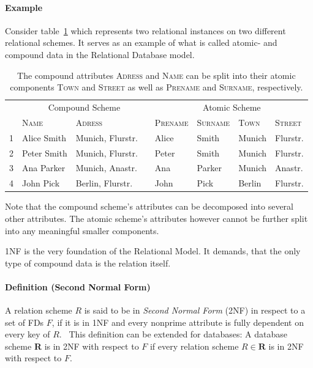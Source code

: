 \paragraph{Example}Consider table~\ref{tab:first-normal-form} which represents two relational instances on two different relational schemes.
It serves as an example of what is called atomic- and compound data in the Relational Database model.~\cite[p.~6]{COD90}

\begin{table}[ht]
    \centering
    \begin{tabular}{rlllllll}
        \toprule
        \toprule
    & \multicolumn{3}{c}{Compound Scheme} & & \multicolumn{2}{c}{Atomic Scheme} \\
    \cmidrule{2-3} \cmidrule{5-8}
    & \textsc{Name} & \textsc{Adress} && \textsc{Prename} & \textsc{Surname} & \textsc{Town} & \textsc{Street}   \\ \midrule
1 & Alice Smith & Munich, Flurstr. && Alice & Smith & Munich & Flurstr. \\
2 & Peter Smith & Munich, Flurstr. && Peter & Smith & Munich & Flurstr. \\
3 & Ana Parker & Munich, Anastr. && Ana & Parker & Munich & Anastr. \\
4 & John Pick & Berlin, Flurstr. && John & Pick & Berlin & Flurstr. \\
\bottomrule
\bottomrule
\end{tabular}
\caption{The compound attributes \textsc{Adress} and \textsc{Name} can be split into their atomic components \textsc{Town} and \textsc{Street} as well as \textsc{Prename} and \textsc{Surname}, respectively.}\label{tab:first-normal-form}
\end{table}
Note that the compound scheme's attributes can be decomposed into several other attributes.
The atomic scheme's attributes however cannot be further split into any meaningful smaller components.

1NF is the very foundation of the Relational Model. It demands, that the only type of compound data is the relation itself.~\cite[p.~6]{COD90}

\paragraph{Definition (Second Normal Form)} A relation scheme \(R\) is said to be in \emph{Second Normal Form} (2NF) in respect to a set of FDs \(F\), if it is in 1NF and every nonprime attribute is fully dependent on every key of \(R\).~\cite[p.~99]{MAI83}
This definition can be extended for databases: A database scheme \textbf{R} is in 2NF with respect to \(F\) if every relation scheme \(R \in \textbf{R} \) is in 2NF with respect to \(F\).

